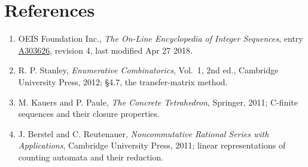\documentclass[11pt]{article}
\theoremstyle{definition}
\begin{document}
\section{References}

\begin{enumerate}

\item OEIS Foundation Inc., \emph{The On-Line Encyclopedia of Integer Sequences}, entry \href{https://oeis.org/A303626}{A303626}, revision 4, last modified Apr 27 2018.

\item R. P. Stanley, \emph{Enumerative Combinatorics}, Vol.~1, 2nd ed., Cambridge University Press, 2012; \S4.7, the transfer-matrix method.

\item M. Kauers and P. Paule, \emph{The Concrete Tetrahedron}, Springer, 2011; C-finite sequences and their closure properties.

\item J. Berstel and C. Reutenauer, \emph{Noncommutative Rational Series with Applications}, Cambridge University Press, 2011; linear representations of counting automata and their reduction.

\end{enumerate}
\end{document}
